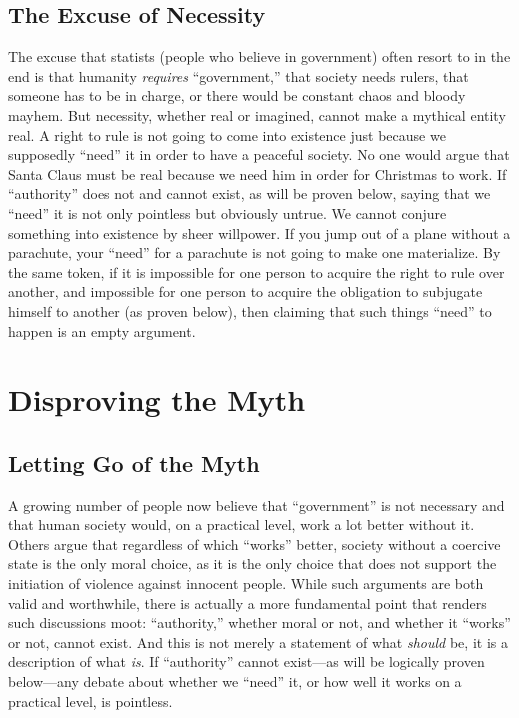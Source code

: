 \documentclass{book}
\begin{document}
\section{The Excuse of Necessity}

The excuse that statists (people who believe in government) often resort to in the end is that humanity \emph{requires} \enquote{government,} that society needs rulers, that someone has to be in charge, or there would be constant chaos and bloody mayhem. But necessity, whether real or imagined, cannot make a mythical entity real. A right to rule is not going to come into existence just because we supposedly \enquote{need} it in order to have a peaceful society. No one would argue that Santa Claus must be real because we need him in order for Christmas to work. If \enquote{authority} does not and cannot exist, as will be proven below, saying that we \enquote{need} it is not only pointless but obviously untrue. We cannot conjure something into existence by sheer willpower. If you jump out of a plane without a parachute, your \enquote{need} for a parachute is not going to make one materialize. By the same token, if it is impossible for one person to acquire the right to rule over another, and impossible for one person to acquire the obligation to subjugate himself to another (as proven below), then claiming that such things \enquote{need} to happen is an empty argument.

\chapter{Disproving the Myth}

\section{Letting Go of the Myth}

A growing number of people now believe that \enquote{government} is not necessary and that human society would, on a practical level, work a lot better without it. Others argue that regardless of which \enquote{works} better, society without a coercive state is the only moral choice, as it is the only choice that does not support the initiation of violence against innocent people. While such arguments are both valid and worthwhile, there is actually a more fundamental point that renders such discussions moot: \enquote{authority,} whether moral or not, and whether it \enquote{works} or not, cannot exist. And this is not merely a statement of what \emph{should} be, it is a description of what \emph{is}. If \enquote{authority} cannot exist---as will be logically proven below---any debate about whether we \enquote{need} it, or how well it works on a practical level, is pointless.
\end{document}
